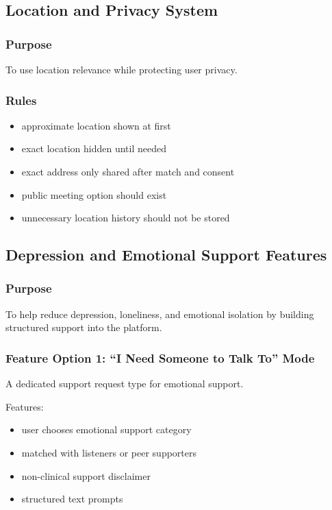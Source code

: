 \documentclass[11pt]{article}
\begin{document}
\subsection{Location and Privacy System}

\subsubsection{Purpose}
To use location relevance while protecting user privacy.

\subsubsection{Rules}
\begin{itemize}[leftmargin=1.5em]
    \item approximate location shown at first
    \item exact location hidden until needed
    \item exact address only shared after match and consent
    \item public meeting option should exist
    \item unnecessary location history should not be stored
\end{itemize}

\subsection{Depression and Emotional Support Features}

\subsubsection{Purpose}
To help reduce depression, loneliness, and emotional isolation by building structured support into the platform.

\subsubsection{Feature Option 1: ``I Need Someone to Talk To'' Mode}
A dedicated support request type for emotional support.

Features:
\begin{itemize}[leftmargin=1.5em]
    \item user chooses emotional support category
    \item matched with listeners or peer supporters
    \item non-clinical support disclaimer
    \item structured text prompts
\end{itemize}
\end{document}
